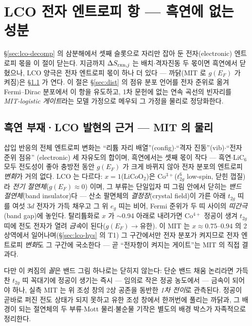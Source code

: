 \section{LCO 전자 엔트로피 항 --- 흑연에 없는 성분}\label{sec:lco-electronic}
\S\ref{sec:lco-decomp} 의 삼분해에서 셋째 슬롯으로 자리만 잡아 둔 전자(electronic) 엔트로피 몫을 이 절이 닫는다.
지금까지 $\Delta S_{\mathrm{rxn},j}$ 는 배치$\cdot$격자진동 두 몫이면 흑연에서 닫혔으나, LCO 양극은 전자 엔트로피
몫이 하나 더 있다 --- 까닭(MIT 로 $g(E_F)$ 가 켜짐)은 \S\ref{sec:lco-why} 가 연다.
이 절은 \S\ref{sec:dist} 의 점유 분포 언어를 전자 준위로 옮겨 Fermi--Dirac 분포에서 이 항을 유도하고,
1차 문헌에 없는 연속 곡선의 빈자리를 \emph{MIT-logistic 게이트}라는 모델 가정으로 메우되 그 가정을 물리로
정당화한다.

\subsection{흑연 부재·LCO 발현의 근거 --- MIT 의 물리}\label{sec:lco-why}
삽입 반응의 전체 엔트로피 변화는 ``리튬 자리 배열''(config)$\cdot$``격자 진동''(vib)$\cdot$``전자 준위 점유''
(electronic) 세 자유도의 합이며, 흑연에서는 셋째 몫이 작다 --- 흑연$\cdot$$\mathrm{LiC_6}$ 모두 전도성이 좋아
충방전 동안 $g(E_F)$ 가 크게 바뀌지 않아 전자 분포의 엔트로피 \emph{변화}가 거의 없다. LCO 는 다르다:
$x{=}1$($\mathrm{LiCoO_2}$)은 Co$^{3+}$($t_{2g}^6$ low-spin, 닫힌 껍질)라 \emph{전기 절연체}($g(E_F)\!\approx\!0$)
이며, 그 부류는 단일입자 띠 그림 안에서 닫히는 \emph{밴드 절연체}(band insulator)다 --- 산소 팔면체의
\emph{결정장}(crystal field)이 가른 아래 $t_{2g}$ 띠를 여섯 $3d$ 전자가 가득 채우고 그 위 $e_g$ 띠는 비어, Fermi 준위가 두 띠 사이의 \emph{띠간극}(band gap)에 놓인다.
탈리튬화로 $x$ 가 $\sim$0.94 아래로 내려가면 Co$^{4+}$ 정공이 생겨 $t_{2g}$ 띠에 전도 전자가 열려
\emph{금속}이 된다($g(E_F)\!\to\!$유한)\cite{menetrier1999,motohashi2009}. 이 MIT 는 $x\approx0.75$--$0.94$ 의
2상역에서 일어나며(\S\ref{sec:lco-hys} 의 T1) 그 구간에서만 전자 분포가 켜지므로 전자 엔트로피 \emph{변화}도
그 구간에 국소한다 --- 곧 ``전자항이 켜지는 게이트''는 MIT 의 직접 결과다.

다만 이 켜짐의 \emph{꼴}은 밴드 그림 하나로는 닫히지 않는다: 단순 밴드 채움 논리라면 가득 찬 $t_{2g}$ 띠
꼭대기에 정공이 생기는 즉시 --- 임의로 작은 정공 농도에서 --- 금속이 되어야 하나, 실측 MIT 는 위 조성 창의
2상 공존을 동반한 \emph{1차 전이}로 관측된다\cite{menetrier1999,reimers1992,motohashi2009}. 정공이 곧바로
퍼진 전도 상태가 되지 못하고 유한 조성 창에서 한꺼번에 풀리는 까닭과, 그 배경이 되는 절연체의
두 부류$\cdot$Mott 물리$\cdot$불순물 기작은 별도의 배경 박스가 자족적으로 정리한다.

